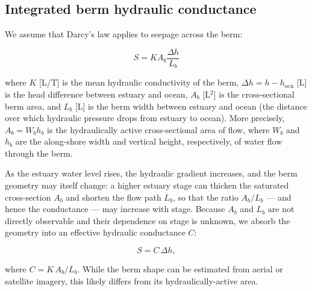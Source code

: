 \documentclass[preprint,12pt,authoryear]{elsarticle}
\begin{document}
\subsection{Integrated berm hydraulic conductance}

We assume that Darcy's law applies to seepage across the berm:

\begin{equation}
    S = K A_b \frac{\Delta h}{ L_b}
    \label{eq:Darcy}
\end{equation}

\noindent where $K$ [L/T] is the mean hydraulic conductivity of the berm, $\Delta h = h - h_{\mathrm{ocn}}$  [L] is the head difference between estuary and ocean, $A_b$ [L$^2$] is the cross-sectional berm area, and $L_b$ [L] is the berm width between estuary and ocean (the distance over which hydraulic pressure drops from estuary to ocean). More precisely, $A_b = W_b h_b$ is the hydraulically active cross-sectional area of flow,  where $W_b$ and $h_b$ are the along-shore width and vertical height, respectively, of water flow through the berm.

As the estuary water level rises, the hydraulic gradient increases, and the berm geometry may itself change: a higher estuary stage can thicken the saturated cross-section $A_b$ and shorten the flow path $L_b$, so that the ratio $A_b/L_b$ --- and hence the conductance --- may increase with stage. Because $A_b$ and $L_b$ are not directly observable and their dependence on stage is unknown, we absorb the geometry into an effective hydraulic conductance $C$:

\begin{equation}
    S = C\,\Delta h,
    \label{eq:tildeK}
\end{equation}

\noindent where $C = K\,A_b/L_b$. While the berm shape can be estimated from aerial or satellite imagery, this likely differs from its hydraulically-active area.

\end{document}
